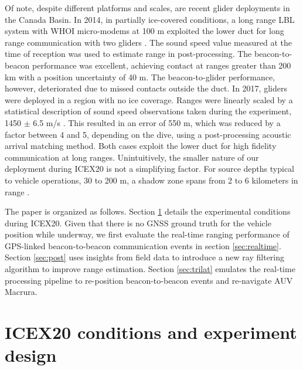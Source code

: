 Of note, despite different platforms and scales, are recent glider deployments in the Canada Basin.
In 2014, in partially ice-covered conditions, a long range LBL system with WHOI micro-modems at 100 m exploited the lower duct for long range communication with two gliders \citep{freitag_long_2015,webster2015towards}.
The sound speed value measured at the time of reception was used to estimate range in post-processing.
The beacon-to-beacon performance was excellent, achieving contact at ranges greater than 200 km with a position uncertainty of 40 m.
The beacon-to-glider performance, however, deteriorated due to missed contacts outside the duct.
In 2017, gliders were deployed in a region with no ice coverage. 
Ranges were linearly scaled by a statistical description of sound speed observations taken during the experiment, 1450 $\pm$ 6.5 m/s \citep{graupe2019preliminary}.
This resulted in an error of 550 m, which was reduced by a factor between 4 and 5, depending on the dive, using a post-processing acoustic arrival matching method.
Both cases exploit the lower duct for high fidelity communication at long ranges.
Unintuitively, the smaller nature of our deployment during ICEX20 is not a simplifying factor.
For source depths typical to vehicle operations, 30 to 200 m, a shadow zone spans from 2 to 6 kilometers in range \citep{schmidt2016acoustic}.

The paper is organized as follows. Section \ref{sec:icex20} details the experimental conditions during ICEX20.
Given that there is no GNSS ground truth for the vehicle position while underway, we first evaluate the real-time ranging performance of GPS-linked beacon-to-beacon communication events in section \ref{sec:realtime}.
Section \ref{sec:post} uses insights from field data to introduce a new ray filtering algorithm to improve range estimation.
Section \ref{sec:trilat} emulates the real-time processing pipeline to re-position beacon-to-beacon events and re-navigate AUV Macrura.

\clearpage
\section{ICEX20 conditions and experiment design}\label{sec:icex20}

